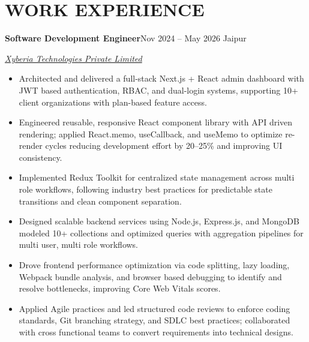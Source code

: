 \documentclass[10pt, letterpaper]{article}
\newcommand{\jobentry}[2]{%
  \noindent\textbf{#1}\hfill #2\par
}
\newcommand{\company}[1]{%
  \noindent\textit{#1}\par\vspace{3pt}
}
\begin{document}
\section*{WORK EXPERIENCE}

\jobentry{Software Development Engineer}{Nov 2024 -- May 2026 \textbar{} Jaipur}
\company{\href{https://www.xyberiatech.com/}{Xyberia Technologies Private Limited}}

\begin{itemize}
  \item Architected and delivered a full-stack Next.js + React admin dashboard with JWT based authentication, RBAC, and dual-login systems, supporting 10+ client organizations with plan-based feature access.
  \item Engineered reusable, responsive React component library with API driven rendering; applied React.memo, useCallback, and useMemo to optimize re-render cycles reducing development effort by 20–25\% and improving UI consistency.
  \item Implemented Redux Toolkit for centralized state management across multi role workflows, following industry best practices for predictable state transitions and clean component separation.
  \item Designed scalable backend services using Node.js, Express.js, and MongoDB modeled 10+ collections and optimized queries with aggregation pipelines for multi user, multi role workflows.
  \item Drove frontend performance optimization via code splitting, lazy loading, Webpack bundle analysis, and browser based debugging to identify and resolve bottlenecks, improving Core Web Vitals scores.
  \item Applied Agile practices and led structured code reviews to enforce coding standards, Git branching strategy, and SDLC best practices; collaborated with cross functional teams to convert requirements into technical designs.
\end{itemize}

\end{document}
